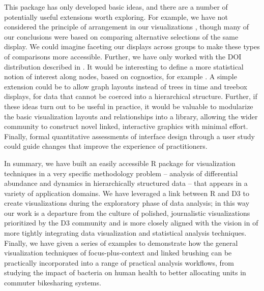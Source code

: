 \documentclass[12pt]{article}
\begin{document}
This package has only developed basic ideas, and there are a number of
potentially useful extensions worth exploring. For example, we have not
considered the principle of arrangement in our visualizations
\citep{buja1996interactive}, though many of our conclusions were based on
comparing alternative selections of the same display. We could imagine faceting
our displays across groups to make these types of comparisons more accessible.
Further, we have only worked with the DOI distribution described in
\citep{heer2004doitrees}. It would be interesting to define a more statistical
notion of interest along nodes, based on cognostics, for example
\citep{hafen2013trelliscope, friedman2002john}. A simple extension could be to
allow graph layouts instead of trees in time and treebox displays, for data that
cannot be coerced into a hierarchical structure. Further, if these ideas turn
out to be useful in practice, it would be valuable to modularize the basic
visualization layouts and relationships into a library, allowing the wider
community to construct novel linked, interactive graphics with minimal effort.
Finally, formal quantitative assessments of interface design through a user
study could guide changes that improve the experience of practitioners.

In summary, we have built an easily accessible R package for visualization
techniques in a very specific methodology problem -- analysis of differential
abundance and dynamics in hierarchically structured data -- that appears in a
variety of application domains. We have leveraged a link between R and D3
\citep{vaidyanathan2014htmlwidgets} to create visualizations during the
exploratory phase of data analysis; in this way our work is a departure from the
culture of polished, journalistic visualizations prioritized by the D3 community
and is more closely aligned with the vision in \citep{de2003visual} of more
tightly integrating data visualization and statistical analysis techniques.
Finally, we have given a series of examples to demonstrate how the general
visualization techniques of focus-plus-context and linked brushing can be
practically incorporated into a range of practical analysis workflows, from
studying the impact of bacteria on human health to better allocating units in
commuter bikesharing systems.



\end{document}
